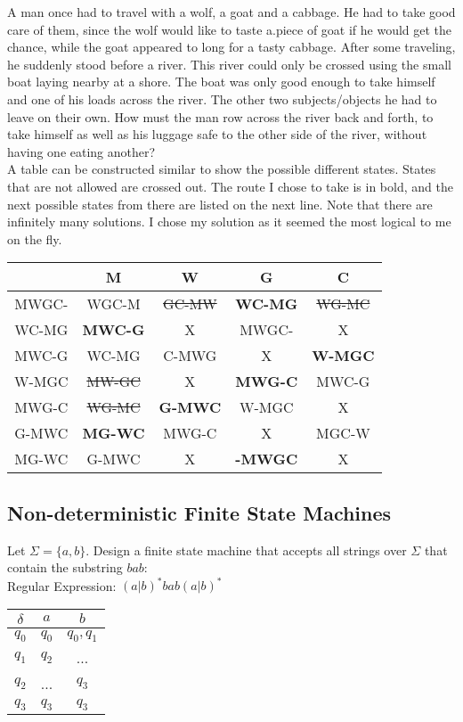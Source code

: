 \documentclass{scrartcl}
\begin{document}
A man once had to travel with a wolf, a goat and a cabbage. He had to take good care of them, since the wolf would like to taste a.piece of goat if he would get the chance, while the goat appeared to long for a tasty cabbage. After some traveling, he suddenly stood before a river. This river could only be crossed using the small boat laying nearby at a shore. The boat was only good enough to take himself and one of his loads across the river. The other two subjects/objects he had to leave on their own. How must the man row across the river back and forth, to take himself as well as his luggage safe to the other side of the river, without having one eating another? \\

A table can be constructed similar to show the possible different states. States that are not allowed are crossed out. The route I chose to take is in bold, and the next possible states from there are listed on the next line. Note that there are infinitely many solutions. I chose my solution as it seemed the most logical to me on the fly.

\begin{center}
\begin{tabular} { |c|c c c c| }
\hline
&M&W&G&C\\
\hline
MWGC-&WGC-M&\sout{GC-MW}&\textbf{WC-MG}&\sout{WG-MC}\\
WC-MG&\textbf{MWC-G}&X&MWGC-&X\\
MWC-G&WC-MG&C-MWG&X&\textbf{W-MGC}\\
W-MGC&\sout{MW-GC}&X&\textbf{MWG-C}&MWC-G\\
MWG-C&\sout{WG-MC}&\textbf{G-MWC}&W-MGC&X\\
G-MWC&\textbf{MG-WC}&MWG-C&X&MGC-W\\
MG-WC&G-MWC&X&\textbf{-MWGC}&X\\
\hline
\end{tabular}
\end{center}

\subsection{Non-deterministic Finite State Machines}
Let $\Sigma=\{a,b\}$. Design a finite state machine that accepts all strings over $\Sigma$ that contain the substring $bab$:\\

Regular Expression: $(a|b)^*bab(a|b)^*$
\begin{center}
\begin{tabular} {|c|c c|}
\hline
$\delta$&$a$&$b$\\
\hline
$q_0$&$q_0$&$q_0,q_1$\\
$q_1$&$q_2$&...\\
$q_2$&...&$q_3$\\
$q_3$&$q_3$&$q_3$\\
\hline
\end{tabular}
\end{center}
\end{document}
